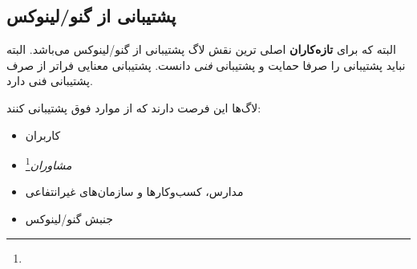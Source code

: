 
\subsection{پشتیبانی از گنو/لینوکس }

البته که برای
{\bfseries تازه‌کاران}
اصلی ترین نقش لاگ پشتیبانی از گنو/لینوکس می‌باشد.
البته نباید پشتیبانی را صرفا حمایت و پشتیبانی
{\itshape فنی}
دانست. پشتیبانی معنایی فراتر از صرف پشتیبانی فنی دارد.

لاگ‌ها این فرصت دارند که از موارد فوق پشتیبانی کنند:

\begin{itemize}
\item
کاربران
\item \emph{مشاوران}\footnote{}
\item
مدارس، کسب‌وکارها و سازمان‌های غیرانتفاعی
\item
جنبش گنو/لینوکس
\end{itemize}

